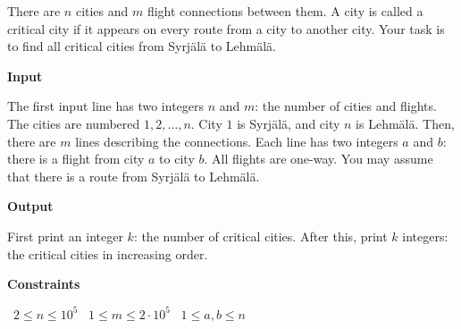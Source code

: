 There are $n$ cities and $m$ flight connections between them. A city is called a critical city if it appears on every route from a city to another city.
Your task is to find all critical cities from Syrjälä to Lehmälä.

\vspace{0.3cm}\noindent\textbf{Input}

The first input line has two integers $n$ and $m$: the number of cities and flights. The cities are numbered $1,2,\dots,n$. City $1$ is Syrjälä, and city $n$ is Lehmälä.
Then, there are $m$ lines describing the connections. Each line has two integers $a$ and $b$: there is a flight from city $a$ to city $b$. All flights are one-way.
You may assume that there is a route from Syrjälä to Lehmälä.

\vspace{0.3cm}\noindent\textbf{Output}

First print an integer $k$: the number of critical cities. After this, print $k$ integers: the critical cities in increasing order.

\vspace{0.3cm}\noindent\textbf{Constraints}

\textbullet\ $2 \le n \le 10^5$
\textbullet\ $1 \le m \le 2 \cdot 10^5$
\textbullet\ $1 \le a,b \le n$